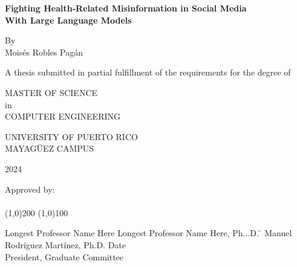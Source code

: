 



\thispagestyle{empty}
\begin{center}
\begin{singlespace}
\textbf{Fighting Health-Related Misinformation in Social Media \\ With Large Language Models}
\end{singlespace}
\vspace{4 mm}
By
\\
\vspace{4 mm}
Mois\'es Robles Pag\'an %
\vspace{4 mm}
\begin{singlespace}
A thesis submitted in partial fulfillment of the requirements for the degree of %
\end{singlespace}
\vspace{4 mm}
MASTER OF SCIENCE %
\\
in
\\
COMPUTER ENGINEERING %
\\
\vspace{4 mm}
\begin{singlespace}

UNIVERSITY OF PUERTO RICO
\\
MAYAG\"UEZ CAMPUS
\end{singlespace}

2024 %
\end{center}
\bigskip
\bigskip
\bigskip
\bigskip
\bigskip
\bigskip
\bigskip

  \noindent Approved by:
\\
\\

  \noindent
\line(1,0){200} \hspace{40 mm} \line(1,0){100}\\
  \noindent
\vspace{-1.75\baselineskip}
  \begin{tabbing}
Longest Professor Name Here Longest Professor Name Here, Ph...D.  \=  \kill 
Manuel Rodríguez Martínez, Ph.D. \>  Date\\President, Graduate Committee 
\end{tabbing}



